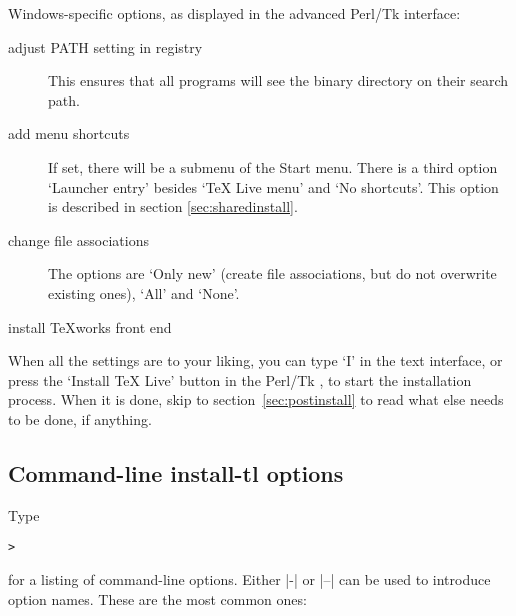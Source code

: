\documentclass{article}
\begin{document}
Windows-specific options, as displayed in the advanced Perl/Tk
interface:
\begin{description}
\item[adjust PATH setting in registry] This ensures that all
  programs will see the \TL{} binary directory on their search path.

\item[add menu shortcuts] If set, there will be a \TL{} submenu of
  the Start menu. There is a third option `Launcher entry' besides
  `TeX Live menu' and `No shortcuts'. This option is described in
  section \ref{sec:sharedinstall}.

\item[change file associations] The options are `Only new' (create
  file associations, but do not overwrite existing ones), `All' and
  `None'.

\item[install \TeX{}works front end]
\end{description}
When all the settings are to your liking, you can type `I' in the
text interface, or press the `Install TeX Live' button in the
Perl/Tk \GUI, to start the installation process. When it is done,
skip to section~\ref{sec:postinstall} to read what else needs to be
done, if anything.

\subsection{Command-line install-tl options}
\label{sec:cmdline}

Type
\begin{alltt}
> 
\end{alltt}
for a listing of command-line options.  Either |-| or |--| can be used
to introduce option names.  These are the most common ones:
\end{document}
